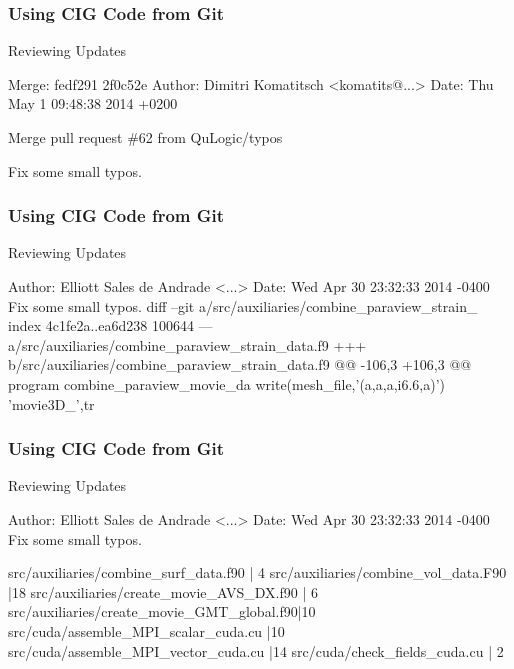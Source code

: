 \begin{frame}[fragile,t]
 \frametitle{Using CIG Code from Git}

 \begin{exampleblock}{Reviewing Updates}
  \begin{semiverbatim}
Merge: fedf291 2f0c52e
Author: Dimitri Komatitsch <komatits@...>
Date:   Thu May 1 09:48:38 2014 +0200

    Merge pull request \#62 from QuLogic/typos

    Fix some small typos.
\end{semiverbatim}
 \end{exampleblock}
\end{frame}

\begin{frame}[fragile,t]
 \frametitle{Using CIG Code from Git}

 \begin{exampleblock}{Reviewing Updates}
  \vspace{-1em}
  \begin{semiverbatim}
 
Author: Elliott Sales de Andrade <...>
Date:   Wed Apr 30 23:32:33 2014 -0400
    Fix some small typos.
diff --git a/src/auxiliaries/combine_paraview_strain_
index 4c1fe2a..ea6d238 100644
--- a/src/auxiliaries/combine_paraview_strain_data.f9
+++ b/src/auxiliaries/combine_paraview_strain_data.f9
@@ -106,3 +106,3 @@ program combine_paraview_movie_da
     write(mesh_file,'(a,a,a,i6.6,a)')  'movie3D_',tr
\end{semiverbatim}
 \end{exampleblock}
\end{frame}

\begin{frame}[fragile,t]
 \frametitle{Using CIG Code from Git}

 \begin{exampleblock}{Reviewing Updates}
  \vspace{-1em}
  \begin{semiverbatim}
Author: Elliott Sales de Andrade <...>
Date:   Wed Apr 30 23:32:33 2014 -0400
    Fix some small typos.

 src/auxiliaries/combine_surf_data.f90      | 4 \hiGreen{+}\hiRed{-}
 src/auxiliaries/combine_vol_data.F90       |18 \hiGreen{++}\hiRed{-{}-}
 src/auxiliaries/create_movie_AVS_DX.f90    | 6 \hiGreen{+}\hiRed{-}
 src/auxiliaries/create_movie_GMT_global.f90|10 \hiGreen{+}\hiRed{-{}-}
 src/cuda/assemble_MPI_scalar_cuda.cu       |10 \hiGreen{+}\hiRed{-{}-}
 src/cuda/assemble_MPI_vector_cuda.cu       |14 \hiGreen{+}\hiRed{-{}-}
 src/cuda/check_fields_cuda.cu              | 2 \hiGreen{+}\hiRed{-}
\end{semiverbatim}
 \end{exampleblock}
\end{frame}

